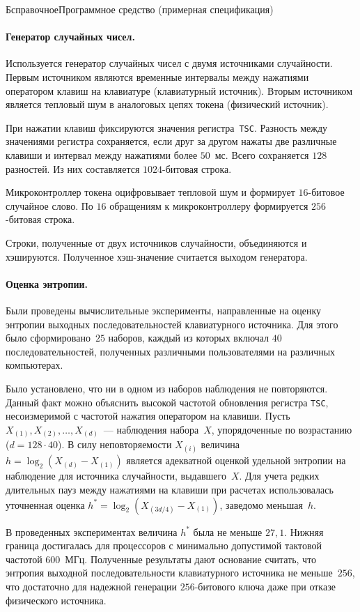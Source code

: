 \begin{appendix}{Б}{справочное}{Программное средство \CryptoDisk 
(примерная спецификация)}
\label{EXAMPLE.RNG}

\paragraph*{Генератор случайных чисел.}
Используется генератор случайных чисел с двумя источниками случайности.
Первым источником являются временные интервалы между нажатиями 
оператором клавиш на клавиатуре (клавиатурный источник).
%
Вторым источником является тепловый шум в аналоговых цепях токена (физический источник).

При нажатии клавиш фиксируются значения регистра~\texttt{TSC}.
Разность между значениями регистра сохраняется,
если друг за другом нажаты две различные клавиши и интервал между нажатиями более $50$~мс. 
Всего сохраняется $128$ разностей.
Из них составляется $1024$-битовая строка.

Микроконтроллер токена оцифровывает тепловой шум и формирует $16$-битовое 
случайное слово. По $16$ обращениям к микроконтроллеру формируется $256$-битовая строка.

Строки, полученные от двух источников случайности, объединяются и хэшируются.
Полученное хэш-значение считается выходом генератора.

\paragraph*{Оценка энтропии.}
Были проведены вычислительные эксперименты,
направленные на оценку энтропии выходных последовательностей
клавиатурного источника.
Для этого было сформировано~$25$ наборов, 
каждый из которых включал $40$ последовательностей,
полученных различными пользователями на различных компьютерах. 

Было установлено, что ни в одном из наборов наблюдения не повторяются.
Данный факт можно объяснить высокой частотой обновления регистра \texttt{TSC},
несоизмеримой с частотой нажатия оператором на клавиши.
%
Пусть $X_{(1)},X_{(2)},\ldots,X_{(d)}$~--- наблюдения набора~$X$, 
упорядоченные по возрастанию ($d=128\cdot 40$). 
%
В силу неповторяемости $X_{(i)}$
величина~$h=\log_2(X_{(d)}-X_{(1)})$
является адекватной оценкой удельной энтропии на наблюдение для источника
случайности, выдавшего~$X$.
%
Для учета редких длительных пауз между нажатиями на клавиши
при расчетах использовалась уточненная оценка $h^*=\log_2(X_{(3d/4)}-X_{(1)})$,
заведомо меньшая~$h$.

В проведенных экспериментах величина $h^*$ была не меньше $27,1$.
%
Нижняя граница достигалась для процессоров 
с минимально допустимой тактовой частотой $600$~МГц.
%
Полученные результаты дают основание считать, что энтропия выходной
последовательности клавиатурного источника не меньше~$256$,
что достаточно для надежной генерации $256$-битового ключа даже при отказе
физического источника.


\end{appendix}
